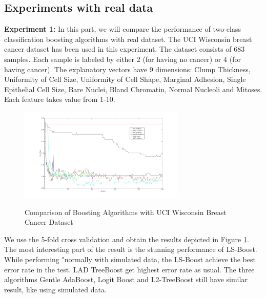 \documentclass[a4paper,twoside,12pt]{article}
\begin{document}
\subsection{Experiments with real data}
\textbf{Experiment 1:} In this part, we will compare the performance of two-class classification boosting algorithms with real dataset. The UCI Wisconsin breast cancer dataset has been used in this experiment. The dataset consists of 683  samples. Each sample is labeled by either 2 (for having no cancer) or 4 (for having cancer). The explanatory vectors have 9 dimensions: Clump Thickness, Uniformity of Cell Size, Uniformity of Cell Shape, Marginal Adhesion, Single Epithelial Cell Size, Bare Nuclei, Bland Chromatin, Normal Nucleoli and Mitoses. Each feature takes value from 1-10.
\begin{figure}[H]
\centering
\caption{Comparison of Boosting Algorithms with UCI Wisconsin Breast Cancer Dataset}
\includegraphics[width = 0.7\textwidth]{Figures/wbc}
\label{fig:wbc}
\end{figure}
We use the 5-fold cross validation and obtain the results depicted in Figure \ref{fig:wbc}. The most interesting part of the result is the stunning performance of LS-Boost. While performing "normally with simulated data, the LS-Boost achieve the best error rate in the test. LAD TreeBoost get highest error rate as usual. The three algorithms Gentle AdaBoost, Logit Boost and L2-TreeBoost still have similar result, like using simulated data.
\end{document}

